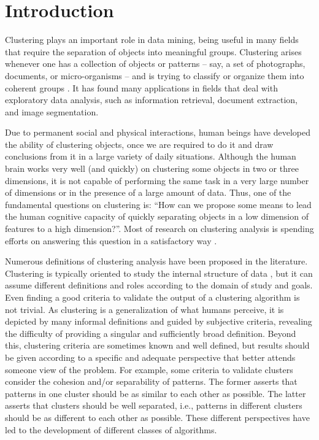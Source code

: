 \chapter{Introduction}
Clustering plays an important role in data mining, being useful in many fields that require the separation of objects into meaningful groups. Clustering arises whenever one has a collection of objects or patterns -- say, a set of photographs, documents, or micro-organisms -- and is trying to classify or organize them into coherent groups \cite{tardos}. It has found many applications in fields that deal with exploratory data analysis, such as information retrieval, document extraction, and image segmentation.

Due to permanent social and physical interactions, human beings have developed the ability of clustering objects, once we are required to do it and draw conclusions from it in a large variety of daily situations. Although the human brain works very well (and quickly) on clustering some objects in two or three dimensions, it is not capable of performing the same task in a very large number of dimensions or in the presence of a large amount of data. Thus, one of the fundamental questions on clustering is: ``How can we propose some means to lead the human cognitive capacity of quickly separating objects in a low dimension of features to a high dimension?''. Most of research on clustering analysis is spending efforts on answering this question in a satisfactory way \cite{Das2009}.

Numerous definitions of clustering analysis have been proposed in the literature. Clustering is typically oriented to study the internal structure of data \cite{Karkkainen2006}, but it can assume different definitions and roles according to the domain of study and goals. Even finding a good criteria to validate the output of a clustering algorithm is not trivial. As clustering is a generalization of what humans perceive, it is depicted by many informal definitions and guided by subjective criteria, revealing the difficulty of providing a singular and sufficiently broad definition. Beyond this, clustering criteria are sometimes known and well defined, but results should be given according to a specific and adequate perspective that better attends someone view of the problem. For example, some criteria to validate clusters consider the cohesion and/or separability of patterns. The former asserts that patterns in one cluster should be as similar to each other as possible. The latter asserts that clusters should be well separated, i.e., patterns in different clusters should be as different to each other as possible. These different perspectives have led to the development of different classes of algorithms.

